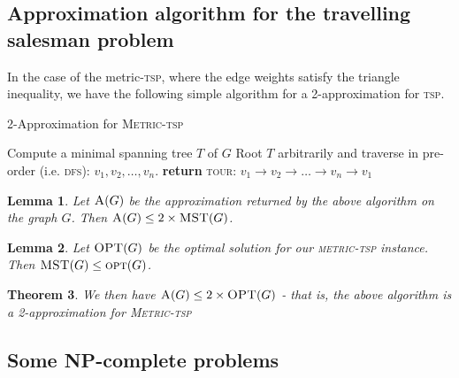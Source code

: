 \documentclass[10pt, oneside, reqno]{amsart}
\theoremstyle{plain}%
\newtheorem{thm}{Theorem}[section]
\newtheorem{lem}[thm]{Lemma}
\theoremstyle{definition}
\theoremstyle{remark}
\begin{document}
\subsection{Approximation algorithm for the travelling salesman problem} %
\label{sub:approximation_algorithm_for_the_travelling_salesman_problem}
In the case of the metric-\textsc{tsp}, where the edge weights satisfy the triangle inequality, we have the following simple algorithm for a 2-approximation for \textsc{tsp}.  

 
\begin{algorithm}[H]
    \label{alg:dynamic_rising_trend}
    \caption{2-Approximation for \textsc{Metric-tsp}}
    \begin{algorithmic}[1]
        \State Compute a minimal spanning tree $T$ of $G$
        \State Root $T$ arbitrarily and traverse in pre-order (i.e. \textsc{dfs}): $v_1, v_2, \dots, v_n$.
        \State \textbf{return} \textsc{tour: $v_1 \rightarrow v_2 \rightarrow \dots \rightarrow v_n \rightarrow v_1$}
    \EndProcedure
    \end{algorithmic}
\end{algorithm}

\begin{lem}
    Let $\textsc{A}(G)$ be the approximation returned by the above algorithm on the graph $G$.  Then $\textsc{A}(G) \leq  2 \times \textsc{MST}(G)$.
\end{lem}

\begin{lem}
    Let $\textsc{OPT}(G)$ be the optimal solution for our \textsc{metric-tsp} instance.  Then  $\textsc{MST}(G) \leq \textsc{opt}(G)$. 
\end{lem}
\begin{thm}
    We then have $\textsc{A}(G) \leq 2 \times \textsc{OPT}(G)$ - that is, the above algorithm is a 2-approximation for \textsc{Metric-tsp}
\end{thm}





\subsection{Some NP-complete problems}
\end{document}
